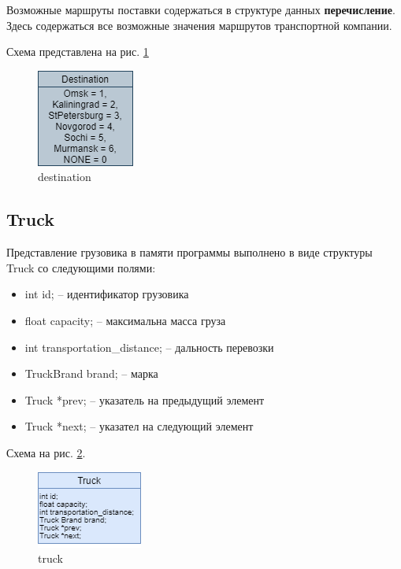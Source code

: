 Возможные маршруты поставки содержаться в структуре данных  \textbf{перечисление}.
Здесь содержаться все возможные значения маршрутов транспортной компании. 

Схема представлена на рис. \ref{destination}

\begin{figure}[hpt!]
    \centering
    \includegraphics[width=0.4\linewidth]{photo/destination}
    \caption{destination}
    \label{destination}
\end{figure}

\subsection{Truck}

Представление грузовика в памяти программы выполнено в виде структуры Truck со следующими полями:

\begin{itemize}
    \item int id; -- идентификатор грузовика
    \item float capacity; -- максимальна масса груза
    \item int transportation\_distance; -- дальность перевозки
    \item TruckBrand brand; -- марка
    \item Truck *prev; -- указатель на предыдущий элемент
    \item Truck *next; -- указател  на следующий элемент
\end{itemize}

Схема на рис. \ref{truck}.

\begin{figure}[H]
    \centering
    \includegraphics[width=0.4\linewidth]{photo/truck}
    \caption{truck}
    \label{truck}
\end{figure}

